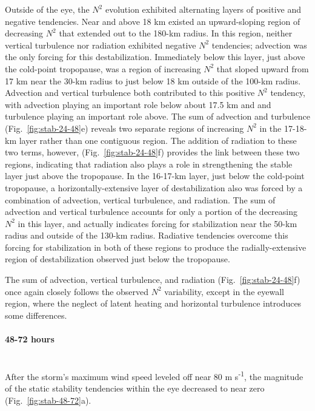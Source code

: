 \documentclass{ametsoc}
\begin{document}
Outside of the eye, the $N^2$ evolution exhibited alternating layers of positive and negative tendencies.
Near and above 18 km existed an upward-sloping region of decreasing $N^2$ that extended out to the 180-km radius.
In this region, neither vertical turbulence nor radiation exhibited negative $N^2$ tendencies; advection was the only forcing for this destabilization.
Immediately below this layer, just above the cold-point tropopause, was a region of increasing $N^2$ that sloped upward from 17 km near the 30-km radius to just below 18 km outside of the 100-km radius.
Advection and vertical turbulence both contributed to this positive $N^2$ tendency, with advection playing an important role below about 17.5 km and and turbulence playing an important role above.
The sum of advection and turbulence (Fig.~\ref{fig:stab-24-48}e) reveals two separate regions of increasing $N^2$ in the 17-18-km layer rather than one contiguous region.
The addition of radiation to these two terms, however, (Fig.~\ref{fig:stab-24-48}f) provides the link between these two regions, indicating that radiation also plays a role in strengthening the stable layer just above the tropopause.
In the 16-17-km layer, just below the cold-point tropopause, a horizontally-extensive layer of destabilization also was forced by a combination of advection, vertical turbulence, and radiation.
The sum of advection and vertical turbulence accounts for only a portion of the decreasing $N^2$ in this layer, and actually indicates forcing for stabilization near the 50-km radius and outside of the 130-km radius.
Radiative tendencies overcome this forcing for stabilization in both of these regions to produce the radially-extensive region of destabilization observed just below the tropopause.

The sum of advection, vertical turbulence, and radiation (Fig.~\ref{fig:stab-24-48}f) once again closely follows the observed $N^2$ variability, except in the eyewall region, where the neglect of latent heating and horizontal turbulence introduces some differences.

\paragraph{48-72 hours}\mbox{}\\
\indent After the storm's maximum wind speed leveled off near 80 m s\textsuperscript{-1}, the magnitude of the static stability tendencies within the eye decreased to near zero (Fig.~\ref{fig:stab-48-72}a).
\end{document}
